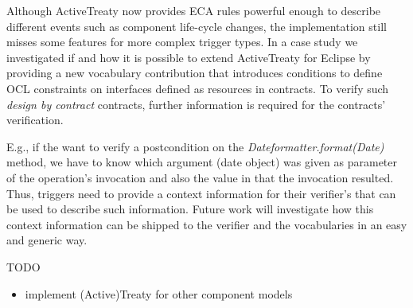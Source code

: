 \documentclass{llncs}
\begin{document}
Although ActiveTreaty now provides ECA rules powerful enough to describe different events such as component life-cycle changes, the implementation still misses some features for more complex trigger types. In a case study \cite{DAWilke} we investigated if and how it is possible to extend ActiveTreaty for Eclipse by providing a new vocabulary contribution that introduces conditions to define OCL constraints on interfaces defined as resources in contracts. To verify such \textit{design by contract} \cite{DesignByContract} contracts, further information is required for the contracts' verification.

E.g., if the want to verify a postcondition on the \textit{Dateformatter.format(Date)} method, we have to know which argument (date object) was given as parameter of the operation's invocation and also the value in that the invocation resulted. Thus, triggers need to provide a context information for their verifier's that can be used to describe such information. Future work will investigate how this context information can be shipped to the verifier and the vocabularies in an easy and generic way.

TODO 

\begin{itemize}
	\item implement (Active)Treaty for other component models
\end{itemize}



  
    
\end{document}
